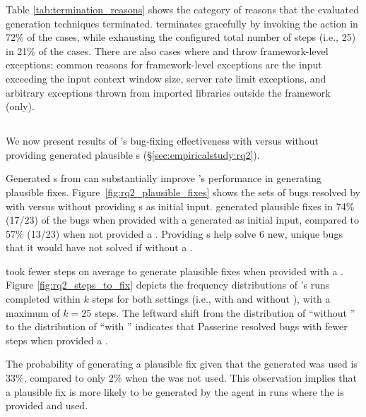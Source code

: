 Table \ref{tab:termination_reasons} shows the category of reasons that the evaluated \brt generation techniques terminated.
\tool{} terminates gracefully by invoking the \actionfinish action in 72\% of the cases, while exhausting the configured total number of steps (i.e., 25) in 21\% of the cases. 
There are also cases where \tool and \libro throw framework-level exceptions; common reasons for framework-level exceptions are the \llm input exceeding the input context window size, server rate limit exceptions, and arbitrary exceptions thrown from imported libraries outside the framework (\tool only).


\subsection{\rqtwotitle{}}
\label{sec:results:generation}

We now present results of \passerine's bug-fixing effectiveness with versus without providing generated plausible \brt{}s (\S\ref{sec:empiricalstudy:rq2}).

Generated \brt{}s from \tool can substantially improve \passerine's performance in generating plausible fixes.
Figure~\ref{fig:rq2_plausible_fixes} shows the sets of bugs resolved by \passerine with versus without providing \brt{}s as initial input. 
\passerine generated plausible fixes in 74\% (17/23) of the bugs when provided with a generated \brt as initial input, compared to 57\% (13/23) when not provided a \brt. 
Providing \brt{}s help \passerine solve 6 new, unique bugs that it would have not solved if without a \brt.

\passerine took fewer steps on average to generate plausible fixes when provided with a \brt. 
Figure \ref{fig:rq2_steps_to_fix} depicts the frequency distributions of \passerine's runs completed within $k$ steps for both settings (i.e., with and without \brt), with a maximum of $k=25$ steps. 
The leftward shift from the distribution of ``without \brt'' to the distribution of ``with \brt'' indicates that Passerine resolved bugs with fewer steps when provided a \brt.


The probability of \passerine generating a plausible fix given that the generated \brt was used is 33\%, compared to only 2\% when the \brt was not used. 
This observation implies that a plausible fix is more likely to be generated by the \autopr agent in runs where the \brt is provided and used.


